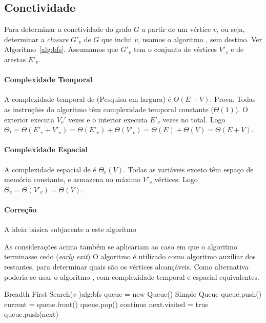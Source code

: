 \documentclass[relatorio.tex]{subfiles}
\begin{document}
\FloatBarrier
\subsection{Conetividade}
\label{subsec:connectivity}

Para determinar a conetividade do grafo $G$ a partir de um vértice $v$,
ou seja, determinar a \textsl{closure} $G'_v$ de $G$ que inclui $v$, usamos
o algoritmo , sem destino. Ver Algoritmo~\ref{alg:bfs}.
Assumamos que $G'_v$ tem o conjunto de vértices $V'_v$ e de arestas $E'_v$.

\paragraph{Complexidade Temporal}
A complexidade temporal de  (Pesquisa em largura)
é $\Theta(E + V)$. Prova. Todas as instruções do algoritmo têm complexidade temporal
constante ($\Theta(1)$). O  exterior executa $V_v'$ vezes e o
 interior executa $E'_v$ vezes no total.
Logo $\Theta_t=\Theta(E'_v+V'_v)=\Theta(E'_v)+\Theta(V'_v)=\Theta(E)+\Theta(V)=\Theta(E+V)$.

\paragraph{Complexidade Espacial}
A complexidade espacial de  é $\Theta_e(V)$. Todas as
variáveis exceto  têm espaço de memória constante, e 
armazena no máximo $V'_v$ vértices. Logo $\Theta_e=\Theta(V'_v)=\Theta(V)$.

\paragraph{Correção}
A ideia básica subjacente a este algoritmo

As considerações acima também se aplicariam ao caso em que o algoritmo
terminasse cedo (\emph{early exit})
O algoritmo  é utilizado como algoritmo auxiliar dos restantes,
para determinar quais são os vértices alcançáveis. Como alternativa
poderia-se usar o algoritmo , com complexidade
temporal e espacial equivalentes.

\begin{algor}{Breadth First Search($v$ )}{alg:bfs}
\State queue = new Queue() \Comment Simple Queue
\State queue.push()
\\
    \State current = queue.front()
    \State queue.pop()
            \State continue
        \EndIf
            \State next.visited = true
            \State queue.push(next)
        \EndIf
    \EndFor
\EndWhile
\end{algor}
\end{document}
